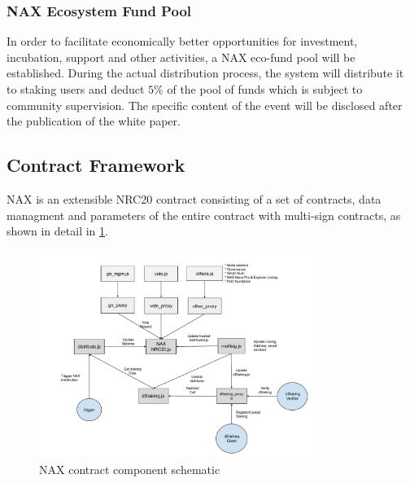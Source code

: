\subsubsection{NAX Ecosystem Fund Pool}
In order to facilitate economically better opportunities for investment, incubation, support and other activities, a NAX eco-fund pool will be established. During the actual distribution process, the system will distribute it to staking users and deduct $5\%$ of the pool of funds which is subject to community supervision. The specific content of the event will be disclosed after the publication of the white paper.

\subsection{Contract Framework}
NAX is an extensible NRC20 contract consisting of a set of contracts, data managment and parameters of the entire contract with multi-sign contracts, as shown in detail in \ref{fig:nax_framework}.

\begin{figure}[htbp]
  \centering
  \includegraphics[width=0.8\textwidth]{../common/nax.pdf}
  \caption{NAX contract component schematic \label{fig:nax_framework}}
\end{figure}
